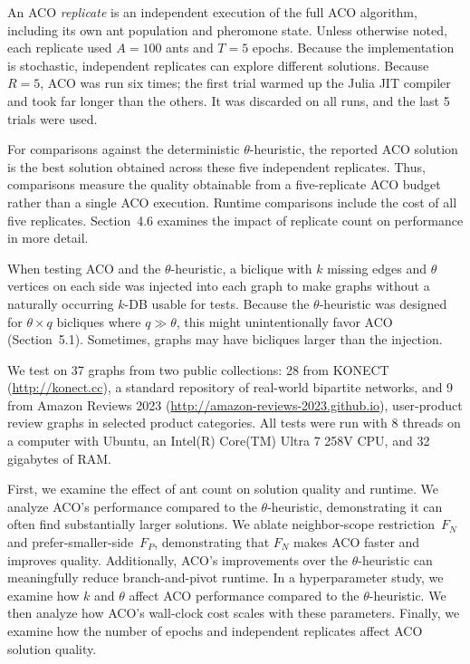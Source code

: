 \documentclass[conference]{IEEEtran}
\begin{document}
An ACO \emph{replicate} is an independent execution of the full ACO algorithm, including its own ant population and pheromone state. Unless otherwise noted, each replicate used $A=100$ ants and $T=5$ epochs. Because the implementation is stochastic, independent replicates can explore different solutions. Because $R = 5$, ACO was run six times; the first trial warmed up the Julia JIT compiler and took far longer than the others. It was discarded on all runs, and the last 5 trials were used.


For comparisons against the deterministic $\theta$-heuristic, the reported ACO solution is the best solution obtained across these five independent replicates. Thus, comparisons measure the quality obtainable from a five-replicate ACO budget rather than a single ACO execution. Runtime comparisons include the cost of all five replicates. Section~4.6 examines the impact of replicate count on performance in more detail.


When testing ACO and the $\theta$-heuristic, a biclique with $k$ missing edges and $\theta$ vertices on each side was injected into each graph to make graphs without a naturally occurring $k$-DB usable for tests. Because the $\theta$-heuristic was designed for $\theta \times q$ bicliques where $q \gg \theta$, this might unintentionally favor ACO (Section~5.1). Sometimes, graphs may have bicliques larger than the injection.


We test on 37 graphs from two public collections: 28 from KONECT (\url{http://konect.cc}), a standard repository of real-world bipartite networks, and 9 from Amazon Reviews 2023 (\url{http://amazon-reviews-2023.github.io}), user-product review graphs in selected product categories. All tests were run with 8 threads on a computer with Ubuntu, an Intel(R) Core(TM) Ultra 7 258V CPU, and 32 gigabytes of RAM.


First, we examine the effect of ant count on solution quality and runtime. We analyze ACO's performance compared to the $\theta$-heuristic, demonstrating it can often find substantially larger solutions.
We ablate neighbor-scope restriction~$F_N$ and prefer-smaller-side~$F_P$, demonstrating that $F_N$ makes ACO faster and improves quality. Additionally, ACO's improvements over the $\theta$-heuristic can meaningfully reduce branch-and-pivot runtime.
In a hyperparameter study, we examine how $k$ and $\theta$ affect ACO performance compared to the $\theta$-heuristic. We then analyze how ACO's wall-clock cost scales with these parameters. Finally, we examine how the number of epochs and independent replicates affect ACO solution quality.
\end{document}
